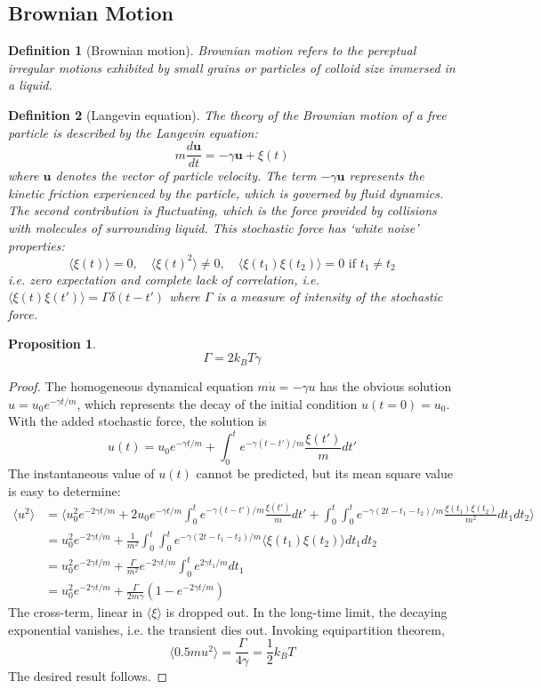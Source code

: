 \documentclass[a4paper]{article}
\theoremstyle{new}
\newtheorem{defi}{Definition}[section]
\newtheorem{prop}{Proposition}[section]
\begin{document}
\subsection{Brownian Motion}
\begin{defi}[Brownian motion]
Brownian motion refers to the pereptual irregular motions exhibited by small grains or particles of colloid size immersed in a liquid.
\end{defi}
\begin{defi}[Langevin equation]
The theory of the Brownian motion of a free particle is described by the Langevin equation:
$$m\frac{d\mathbf{u}}{dt}=-\gamma\mathbf{u}+\xi(t)$$
where $\mathbf{u}$ denotes the vector of particle velocity. The term $-\gamma\mathbf{u}$ represents the kinetic friction experienced by the particle, which is governed by fluid dynamics. The second contribution is fluctuating, which is the force provided by collisions with molecules of surrounding liquid. This stochastic force has `white noise' properties:
$$\langle\xi(t)\rangle=0,\quad\langle\xi(t)^2\rangle\neq 0,\quad\langle\xi(t_1)\xi(t_2)\rangle=0\text{ if }t_1\neq t_2$$
i.e. zero expectation and complete lack of correlation, i.e. $\langle\xi(t)\xi(t')\rangle=\Gamma\delta(t-t')$ where $\Gamma$ is a measure of intensity of the stochastic force.
\end{defi}
\begin{prop}
$$\Gamma=2k_BT\gamma$$
\end{prop}
\begin{proof}
The homogeneous dynamical equation $m\dot{u}=-\gamma u$ has the obvious solution $u=u_0e^{-\gamma t/m}$, which represents the decay of the initial condition $u(t=0)=u_0$. With the added stochastic force, the solution is
$$u(t)=u_0e^{-\gamma t/m}+\int_0^te^{-\gamma(t-t')/m}\frac{\xi(t')}{m}dt'$$
The instantaneous value of $u(t)$ cannot be predicted, but its mean square value is easy to determine:
\begin{align}
    \langle u^2\rangle&=\bigg\langle u_0^2e^{-2\gamma t/m}+2u_0e^{-\gamma t/m}\int_0^te^{-\gamma(t-t')/m}\frac{\xi(t')}{m}dt'+\int_0^t\int_0^te^{-\gamma(2t-t_1-t_2)/m}\frac{\xi(t_1)\xi(t_2)}{m^2}dt_1dt_2\bigg\rangle\nonumber\\&=u_0^2e^{-2\gamma t/m}+\frac{1}{m^2}\int_0^t\int_0^te^{-\gamma(2t-t_1-t_2)/m}\langle\xi(t_1)\xi(t_2)\rangle dt_1dt_2\nonumber\\&=u_0^2e^{-2\gamma t/m}+\frac{\Gamma}{m^2}e^{-2\gamma t/m}\int_0^te^{2\gamma t_1/m}dt_1\nonumber\\&=u_0^2e^{-2\gamma t/m}+\frac{\Gamma}{2m\gamma}(1-e^{-2\gamma t/m})\nonumber
\end{align}
The cross-term, linear in $\langle\xi\rangle$ is dropped out. In the long-time limit, the decaying exponential vanishes, i.e. the transient dies out. Invoking equipartition theorem,
$$\langle0.5mu^2\rangle=\frac{\Gamma}{4\gamma}=\frac{1}{2}k_BT$$
The desired result follows.
\end{proof}
\end{document}
